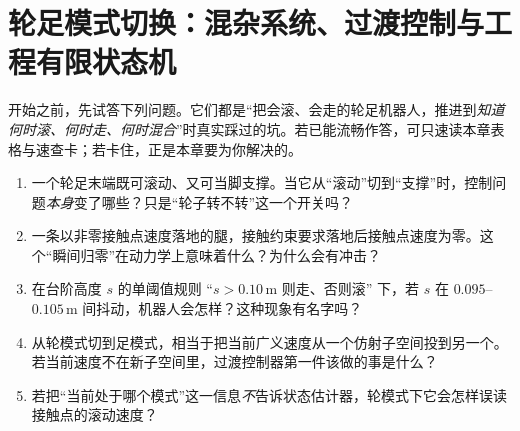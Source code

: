 \chapter{轮足模式切换：混杂系统、过渡控制与工程有限状态机}\label{ch:wl-modeswitch}


\begin{practice}[前置自测]
开始之前，先试答下列问题。它们都是“把会滚、会走的轮足机器人，推进到\emph{知道何时滚、何时走、何时混合}”时真实踩过的坑。若已能流畅作答，可只速读本章表格与速查卡；若卡住，正是本章要为你解决的。
\begin{enumerate}
  \item 一个轮足末端既可滚动、又可当脚支撑。当它从“滚动”切到“支撑”时，控制问题\emph{本身}变了哪些？只是“轮子转不转”这一个开关吗？
  \item 一条以非零接触点速度落地的腿，接触约束要求落地后接触点速度为零。这个“瞬间归零”在动力学上意味着什么？为什么会有冲击？
  \item 在台阶高度 $s$ 的单阈值规则 “$s>0.10\,$m 则走、否则滚” 下，若 $s$ 在 $0.095$–$0.105\,$m 间抖动，机器人会怎样？这种现象有名字吗？
  \item 从轮模式切到足模式，相当于把当前广义速度从一个仿射子空间投到另一个。若当前速度不在新子空间里，过渡控制器第一件该做的事是什么？
  \item 若把“当前处于哪个模式”这一信息\emph{不}告诉状态估计器，轮模式下它会怎样误读接触点的滚动速度？
\end{enumerate}
\end{practice}

